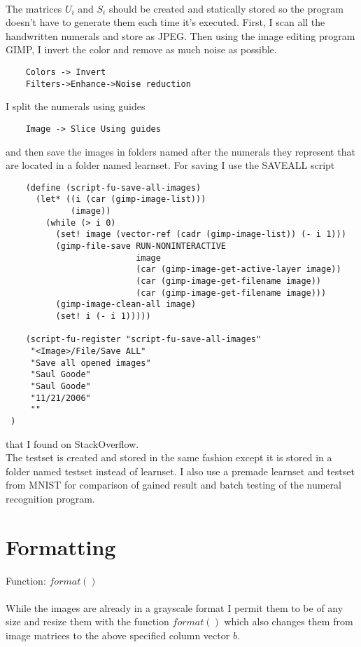 \documentclass{article}
\begin{document}
	\paragraph{}
	The matrices $U_i$ and $S_i$ should be created and statically stored so the program doesn’t have to generate them each time it’s executed.
	First, I scan all the handwritten numerals and store as JPEG. Then using the image editing program GIMP, I invert the color and remove as much noise as possible.
	\begin{lstlisting}
	Colors -> Invert
	Filters->Enhance->Noise reduction
	\end{lstlisting}
	I split the numerals using guides
	\begin{lstlisting}
	Image -> Slice Using guides
	\end{lstlisting}
	and then save the images in folders named after the numerals they represent that are located in a folder named learnset.
	For saving I use the SAVEALL script
	\begin{lstlisting}	
	(define (script-fu-save-all-images) 
	  (let* ((i (car (gimp-image-list))) 
	         (image)) 
	    (while (> i 0) 
	      (set! image (vector-ref (cadr (gimp-image-list)) (- i 1))) 
	      (gimp-file-save RUN-NONINTERACTIVE 
	                      image 
	                      (car (gimp-image-get-active-layer image)) 
	                      (car (gimp-image-get-filename image)) 
	                      (car (gimp-image-get-filename image))) 
	      (gimp-image-clean-all image) 
	      (set! i (- i 1))))) 
	
	(script-fu-register "script-fu-save-all-images" 
	 "<Image>/File/Save ALL" 
	 "Save all opened images" 
	 "Saul Goode" 
	 "Saul Goode" 
	 "11/21/2006" 
	 "" 
 ) 
	\end{lstlisting}
	that I found on StackOverflow\cite{saveall}.\\
	\newpage
	The testset is created and stored in the same fashion except it is stored in a folder named testset instead of learnset.
	I also use a premade learnset and testset from MNIST\cite{mnist} for comparison of gained result and batch testing of the numeral recognition program.
	
	\section{Formatting}
	Function: $format()$
	
	\paragraph{}
	While the images are already in a grayscale format I permit them to be of any size and resize them with the function $format()$ which also changes them from image matrices to the above specified column vector $b$.
	
\end{document}
